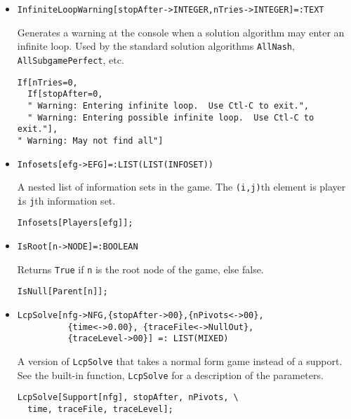 \begin{itemize}
\item{}
\protect \large \begin{verbatim}
InfiniteLoopWarning[stopAfter->INTEGER,nTries->INTEGER]=:TEXT
\end{verbatim}\normalsize

\bd 
Generates a warning at the console when a solution algorithm may enter
an infinite loop.  Used by the standard solution algorithms
\verb+AllNash+, \verb+AllSubgamePerfect+, etc.  

\begin{verbatim}
If[nTries=0,
  If[stopAfter=0,
  " Warning: Entering infinite loop.  Use Ctl-C to exit.",
  " Warning: Entering possible infinite loop.  Use Ctl-C to exit."],
" Warning: May not find all"]
\end{verbatim} 
\ed

\item{}
\protect \large \begin{verbatim}
Infosets[efg->EFG]=:LIST(LIST(INFOSET))
\end{verbatim}\normalsize

\bd 
A nested list of information sets in the game. The \verb+(i,j)+th
element is player \verb+i+s \verb+j+th information set.  
\begin{verbatim}
Infosets[Players[efg]];
\end{verbatim} 
\ed

\item{}
\protect \large \begin{verbatim}
IsRoot[n->NODE]=:BOOLEAN
\end{verbatim}\normalsize

\bd 
Returns \verb+True+ if \verb+n+ is the root node of the game, else
false.  
\begin{verbatim}
IsNull[Parent[n]];
\end{verbatim} 
\ed

\item{}
\protect \large \begin{verbatim}
LcpSolve[nfg->NFG,{stopAfter->00},{nPivots<->00}, 
          {time<->0.00}, {traceFile<->NullOut}, 
          {traceLevel->00}] =: LIST(MIXED)
\end{verbatim}\normalsize

\bd 
A version of \verb+LcpSolve+ that takes a normal form
game instead of a support.  See the built-in function,
\verb+LcpSolve+ for a description of the parameters.
\begin{verbatim}
LcpSolve[Support[nfg], stopAfter, nPivots, \
  time, traceFile, traceLevel];
\end{verbatim} 
\ed


\end{itemize}
